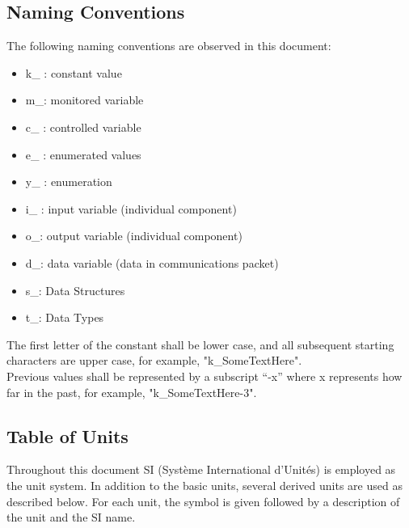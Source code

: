 \documentclass[12pt]{article}
\begin{document}
\subsection{Naming Conventions}
The following naming conventions are observed in this document:
\begin{itemize}
    \item k\_ : constant value
    \item m\_: monitored variable
    \item c\_ : controlled variable
    \item e\_ : enumerated values
    \item y\_ : enumeration
    \item i\_ : input variable (individual component)
    \item o\_: output variable (individual component)
    \item d\_: data variable (data in communications packet)
    \item s\_: Data Structures
    \item t\_: Data Types
\end{itemize}
The first letter of the constant shall be lower case, and all subsequent starting characters
are upper case, for example, "k\_SomeTextHere". \\
Previous values shall be represented by a subscript “-x” where x represents how far in the
past, for example, "k\_SomeTextHere-3".

\subsection{Table of Units}
Throughout this document SI (Syst\`{e}me International d'Unit\'{e}s) is employed
as the unit system.  In addition to the basic units, several derived units are
used as described below.  For each unit, the symbol is given followed by a
description of the unit and the SI name.
~\newline
\end{document}
